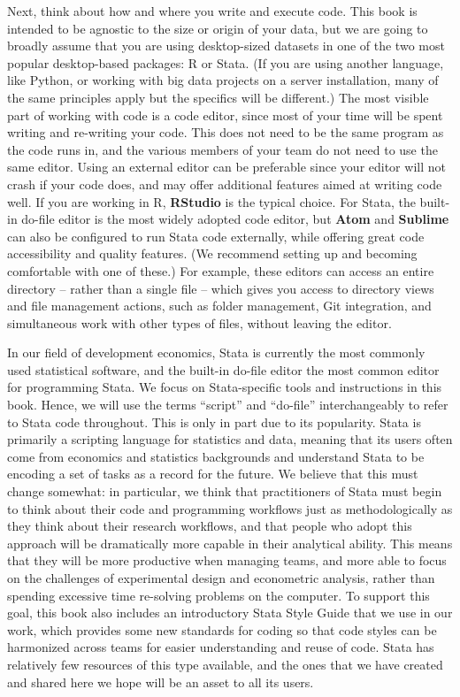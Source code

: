 Next, think about how and where you write and execute code.
This book is intended to be agnostic to the size or origin of your data,
but we are going to broadly assume that you are using desktop-sized datasets
in one of the two most popular desktop-based packages: R or Stata.
(If you are using another language, like Python,
or working with big data projects on a server installation,
many of the same principles apply but the specifics will be different.)
The most visible part of working with code is a code editor,
since most of your time will be spent writing and re-writing your code.
This does not need to be the same program as the code runs in,
and the various members of your team do not need to use the same editor.
Using an external editor can be preferable since your editor will not crash if your code does,
and may offer additional features aimed at writing code well.
If you are working in R, \textbf{RStudio} is the typical choice.
For Stata, the built-in do-file editor is the most widely adopted code editor,
but \textbf{Atom} and
\textbf{Sublime}
can also be configured to run Stata code externally,
while offering great code accessibility and quality features.
(We recommend setting up and becoming comfortable with one of these.)
For example, these editors can access an entire directory -- rather than a single file --
which gives you access to directory views and file management actions,
such as folder management, Git integration,
and simultaneous work with other types of files, without leaving the editor.

In our field of development economics,
Stata is currently the most commonly used statistical software,
and the built-in do-file editor the most common editor for programming Stata.
We focus on Stata-specific tools and instructions in this book.
Hence, we will use the terms ``script'' and ``do-file''
interchangeably to refer to Stata code throughout.
This is only in part due to its popularity.
Stata is primarily a scripting language for statistics and data,
meaning that its users often come from economics and statistics backgrounds
and understand Stata to be encoding a set of tasks as a record for the future.
We believe that this must change somewhat:
in particular, we think that practitioners of Stata
must begin to think about their code and programming workflows
just as methodologically as they think about their research workflows,
and that people who adopt this approach will be dramatically
more capable in their analytical ability.
This means that they will be more productive when managing teams,
and more able to focus on the challenges of experimental design
and econometric analysis, rather than spending excessive time
re-solving problems on the computer.
To support this goal, this book also includes
an introductory Stata Style Guide
that we use in our work, which provides
some new standards for coding so that code styles
can be harmonized across teams for easier understanding and reuse of code.
Stata has relatively few resources of this type available,
and the ones that we have created and shared here
we hope will be an asset to all its users.


